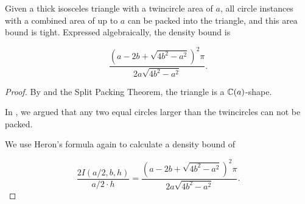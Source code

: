 \documentclass[a4paper,style=print,oneside,bibliography=totoc,nexus,lnum,extramargin]{tubsbook}
\begin{document}
\begin{theorem}
    Given a thick isosceles triangle with a twincircle area of $a$, all circle instances with a combined area of up to $a$ can be packed into the triangle, and this area bound is tight. Expressed algebraically, the density bound is

    $$\frac{(a-2b+\sqrt{4b^2-a^2})^2\pi}{2a\sqrt{4b^2-a^2}}.$$
\end{theorem}

\begin{proof}
    By  and the Split Packing Theorem, the triangle is a $\mathbb{C}(a)$-shape.

    In , we argued that any two equal circles larger than the twincircles can not be packed.

    We use Heron's formula again to calculate a density bound of

    $$\frac{2I(a/2, b, h)}{a/2\cdot h} = \frac{(a-2b+\sqrt{4b^2-a^2})^2\pi}{2a\sqrt{4b^2-a^2}}.$$
\end{proof}

%
%
%
%
%
%
%
\end{document}
